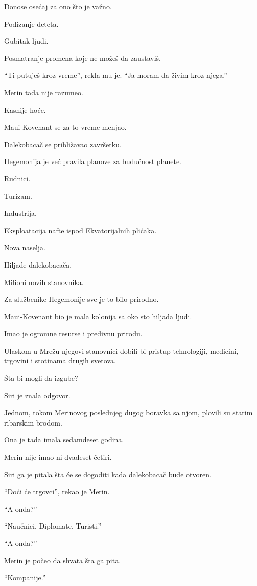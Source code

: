 Donose osećaj za ono što je važno.

Podizanje deteta.

Gubitak ljudi.

Posmatranje promena koje ne možeš da zaustaviš.

``Ti putuješ kroz vreme'', rekla mu je. ``Ja moram da živim kroz njega.''

Merin tada nije razumeo.

Kasnije hoće.

\bigskip

Maui-Kovenant se za to vreme menjao.

Dalekobacač se približavao završetku.

Hegemonija je već pravila planove za budućnost planete.

Rudnici.

Turizam.

Industrija.

Eksploatacija nafte ispod Ekvatorijalnih plićaka.

Nova naselja.

Hiljade dalekobacača.

Milioni novih stanovnika.

Za službenike Hegemonije sve je to bilo prirodno.

Maui-Kovenant bio je mala kolonija sa oko sto hiljada ljudi.

Imao je ogromne resurse i predivnu prirodu.

Ulaskom u Mrežu njegovi stanovnici dobili bi pristup tehnologiji, medicini, trgovini i stotinama drugih svetova.

Šta bi mogli da izgube?

Siri je znala odgovor.

Jednom, tokom Merinovog poslednjeg dugog boravka sa njom, plovili su starim ribarskim brodom.

Ona je tada imala sedamdeset godina.

Merin nije imao ni dvadeset četiri.

Siri ga je pitala šta će se dogoditi kada dalekobacač bude otvoren.

``Doći će trgovci'', rekao je Merin.

``A onda?''

``Naučnici. Diplomate. Turisti.''

``A onda?''

Merin je počeo da shvata šta ga pita.

``Kompanije.''

